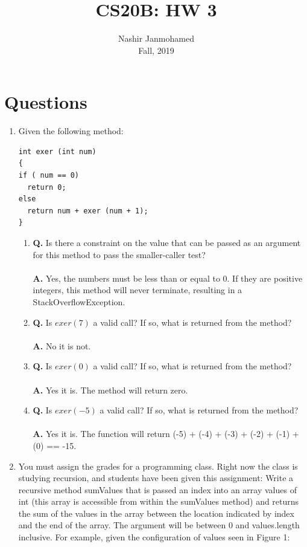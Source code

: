 \documentclass[12pt]{article}
\begin{document}
 
 
\title{CS20B: HW 3}
\author{Nashir Janmohamed\\
Fall, 2019}

\maketitle
\section{Questions}
\begin{enumerate}
  \item Given the following method:
  \begin{lstlisting}
int exer (int num)
{
if ( num == 0)
  return 0;
else
  return num + exer (num + 1);
}
  \end{lstlisting}
  \begin{enumerate}[label=\Alph*]
    \item \textbf{Q.} Is there a constraint on the value that can be passed as an argument for this method to pass the smaller-caller test?
    \\\\
    \textbf{A.} Yes, the numbers must be less than or equal to 0. If they are positive integers, this method will never terminate, resulting in a StackOverflowException.
    \\
    \item \textbf{Q.} Is $exer(7)$ a valid call? If so, what is returned from the method?
    \\\\
    \textbf{A.} No it is not.
    \\
    \item \textbf{Q.} Is $exer(0)$ a valid call? If so, what is returned from the method?
    \\\\
    \textbf{A.} Yes it is. The method will return zero.
    \\
    \item \textbf{Q.} Is $exer(-5)$ a valid call? If so, what is returned from the method?
    \\\\
    \textbf{A.} Yes it is. The function will return (-5) + (-4) + (-3) + (-2) + (-1) + (0) == -15.
  \end{enumerate}
  \item
  You must assign the grades for a programming class. Right now the class is studying recursion, and students have been given this assignment: Write a recursive method sumValues that is passed an index into an array values of int (this array is accessible from within the sumValues method) and returns the sum of the values in the array between the location indicated by index and the end of the array. The argument will be between 0 and values.length inclusive. For example, given the configuration of values seen in Figure 1:
  

\end{enumerate}
\end{document}
